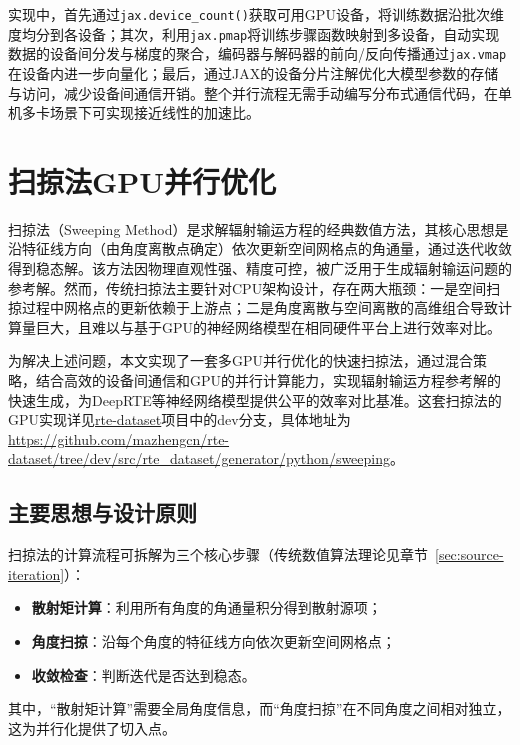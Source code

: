 实现中，首先通过\texttt{jax.device\_count()}获取可用GPU设备，将训练数据沿批次维度均分到各设备；其次，利用\texttt{jax.pmap}将训练步骤函数映射到多设备，自动实现数据的设备间分发与梯度的聚合，编码器与解码器的前向/反向传播通过\texttt{jax.vmap}在设备内进一步向量化；最后，通过JAX的设备分片注解优化大模型参数的存储与访问，减少设备间通信开销。整个并行流程无需手动编写分布式通信代码，在单机多卡场景下可实现接近线性的加速比。

\section{扫掠法GPU并行优化}

扫掠法（Sweeping Method）是求解辐射输运方程的经典数值方法，其核心思想是沿特征线方向（由角度离散点确定）依次更新空间网格点的角通量，通过迭代收敛得到稳态解。该方法因物理直观性强、精度可控，被广泛用于生成辐射输运问题的参考解。然而，传统扫掠法主要针对CPU架构设计，存在两大瓶颈：一是空间扫掠过程中网格点的更新依赖于上游点；二是角度离散与空间离散的高维组合导致计算量巨大，且难以与基于GPU的神经网络模型在相同硬件平台上进行效率对比。

为解决上述问题，本文实现了一套多GPU并行优化的快速扫掠法，通过混合策略，结合高效的设备间通信和GPU的并行计算能力，实现辐射输运方程参考解的快速生成，为DeepRTE等神经网络模型提供公平的效率对比基准。这套扫掠法的GPU实现详见\href{https://github.com/mazhengcn/rte-dataset/tree/dev/src/rte_dataset/generator/python/sweeping}{rte-dataset}项目中的dev分支，具体地址为\url{https://github.com/mazhengcn/rte-dataset/tree/dev/src/rte_dataset/generator/python/sweeping}。

\subsection{主要思想与设计原则}

扫掠法的计算流程可拆解为三个核心步骤（传统数值算法理论见章节~\ref{sec:source-iteration}）：

\begin{itemize}
    \item \textbf{散射矩计算}：利用所有角度的角通量积分得到散射源项；
    \item \textbf{角度扫掠}：沿每个角度的特征线方向依次更新空间网格点；
    \item \textbf{收敛检查}：判断迭代是否达到稳态。
\end{itemize}
其中，“散射矩计算”需要全局角度信息，而“角度扫掠”在不同角度之间相对独立，这为并行化提供了切入点。

